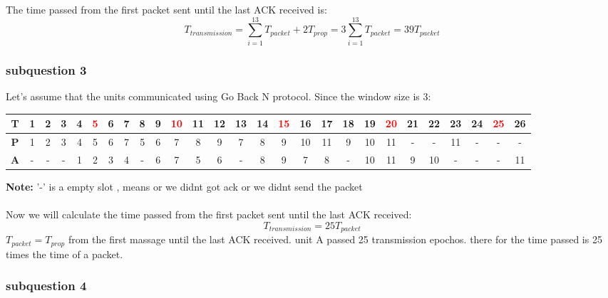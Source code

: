 \documentclass{article}
\begin{document}
    The time passed from the first packet sent until the last ACK received is:
    \begin{equation}
        T_{transmission}  = \sum^{13}_{i=1} T_{packet} + 2T_{prop} =  3\sum^{13}_{i=1} T_{packet} = 39T_{packet}
    \end{equation}
    
    \subsubsection{subquestion 3}
    Let's assume that the units communicated using Go Back N protocol.
    Since the window size is 3:\\
        \begin{tabular}{|c|c|c|c|c|c|c|c|c|c|c|c|c|c|c|c|c|c|c|c|c|c|c|c|c|c|c|}
            \hline
            \textbf{T} & 1 & 2 & 3 & 4 & \textcolor{red}{5} & 6 & 7 & 8 & 9 & \textcolor{red}{10} & 11 & 12 & 13 & 14 & \textcolor{red}{15} & 16 & 17 & 18 & 19 & \textcolor{red}{20} & 21 & 22 & 23 & 24 & \textcolor{red}{25} & 26\\
            \hline
            \textbf{P} & 1 & 2 & 3 & 4 & 5 & 6 & 7 & 5 & 6 & 7 & 8 & 9 & 7 & 8 & 9 & 10 & 11 & 9 & 10 & 11 & - & - & 11 & - & -  & - \\
            \hline
            \textbf{A} & - & - & - & 1 & 2 & 3 & 4 & - & 6 & 7 & 5 & 6 & - & 8 & 9 & 7 & 8 & - & 10 & 11 & 9 & 10 & - & - & - & 11 \\
            \hline
        \end{tabular}
        \textbf{Note:} '-' is a empty slot , means or we didnt got ack or we didnt send the packet\\\\
        Now we will calculate the time passed from the first packet sent until the last ACK received:
        \begin{equation}
            T_{transmission}  = 25T_{packet}
        \end{equation}
        $T_{packet} = T_{prop}$ from the first massage until the last ACK received. unit A passed 25 transmission epochos. there for the time passed is 25 times the time of a packet.
        
        \subsubsection{subquestion 4}
        
\end{document}
